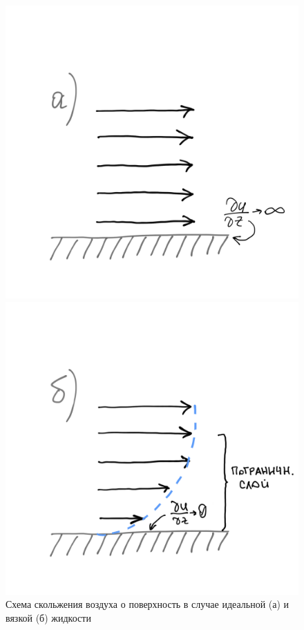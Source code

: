     \begin{figure}
    \begin{minipage}[b]{.52\textwidth} %
        \centering
        \includegraphics[width=1\linewidth]{pics/ch14_bl_a.png}
        \end{minipage}%
    \begin{minipage}[b]{.48\textwidth} %
      \centering
      \includegraphics[width=1\linewidth]{pics/ch14_bl_b.png}
    \end{minipage}
    \caption{\label{fig:ch14_bl} {\color{red}Схема скольжения воздуха о поверхность в случае идеальной  (а) и вязкой (б) жидкости }}
    \end{figure}

